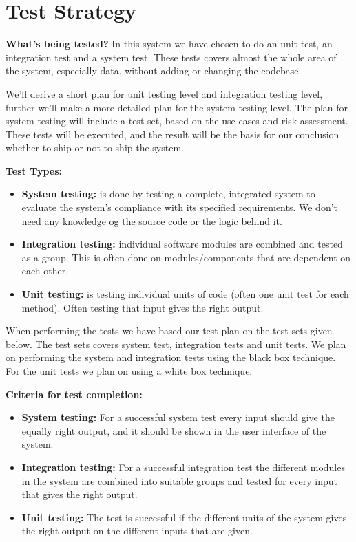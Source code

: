 \chapter{Test Strategy}

	\clearpage

	{\bf What’s being tested?} In this system we have chosen to do  an unit test, 
	an integration test and a system test. 
	These tests covers almost the whole area of the system, especially data, without adding 
	or changing the codebase.

	We’ll derive a short plan for unit testing level and integration testing level, further 
	we’ll make a more detailed plan for the system testing level. The plan for system testing 
	will include a test set, based on the use cases and risk assessment. These tests will be 
	executed, and the result will be the basis for our conclusion whether to ship or not to 
	ship the system.

	{\bf Test Types:}
		\begin{itemize}
			\item {\bf System testing:} is done by testing a complete, integrated system to 
			evaluate the system's compliance with its specified requirements. We don’t need 
			any knowledge og the source code or the logic behind it.
			\item {\bf Integration testing:} individual software modules are combined and tested as a group. 
			This is often done on modules/components that are dependent on each other. 
			\item {\bf Unit testing:} is testing individual units of code (often one unit test for each method). 
			Often testing that input gives the right output. 
		\end{itemize}

	When performing the tests we have based our test plan on the test sets given below. The test sets covers system test, integration tests and unit tests. We plan on performing the system and integration tests using the black box technique. For the unit tests we plan on using a white box technique. 

	{\bf Criteria for test completion:}
		\begin{itemize}
			\item {\bf System testing:} For a successful system test every input should give the equally right 
			output, and it should be shown in the user interface of the system. 
			\item {\bf Integration testing:} For a successful integration test the different modules in the 
			system are combined into suitable groups and tested for every input that gives the right output.  
			\item {\bf Unit testing:} The test is successful if the different units of the system gives the 
			right output on the different inputs that are given. 
		\end{itemize}

